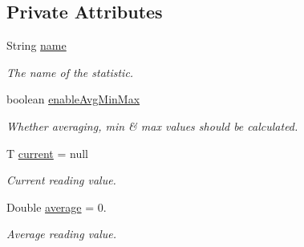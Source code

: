 \subsection*{Private Attributes}
\begin{DoxyCompactItemize}
\item 
\mbox{\label{classcom_1_1jack_1_1motorbikestatistics_1_1_data_item_a09f8b80430dc1620acbe3532d900fc5a}} 
String \hyperlink{classcom_1_1jack_1_1motorbikestatistics_1_1_data_item_a09f8b80430dc1620acbe3532d900fc5a}{name}
\begin{DoxyCompactList}\small\item\em The name of the statistic. \end{DoxyCompactList}\item 
\mbox{\label{classcom_1_1jack_1_1motorbikestatistics_1_1_data_item_a7cfeefe9064017755f8462421693d2a9}} 
boolean \hyperlink{classcom_1_1jack_1_1motorbikestatistics_1_1_data_item_a7cfeefe9064017755f8462421693d2a9}{enable\+Avg\+Min\+Max}
\begin{DoxyCompactList}\small\item\em Whether averaging, min \& max values should be calculated. \end{DoxyCompactList}\item 
\mbox{\label{classcom_1_1jack_1_1motorbikestatistics_1_1_data_item_a48cf1c273c44e2181a99d56c48868d1d}} 
T \hyperlink{classcom_1_1jack_1_1motorbikestatistics_1_1_data_item_a48cf1c273c44e2181a99d56c48868d1d}{current} = null
\begin{DoxyCompactList}\small\item\em Current reading value. \end{DoxyCompactList}\item 
\mbox{\label{classcom_1_1jack_1_1motorbikestatistics_1_1_data_item_a720fe4f7fa02578cc8e0a59ef784746d}} 
Double \hyperlink{classcom_1_1jack_1_1motorbikestatistics_1_1_data_item_a720fe4f7fa02578cc8e0a59ef784746d}{average} = 0.
\begin{DoxyCompactList}\small\item\em Average reading value. \end{DoxyCompactList}\item 

\end{DoxyCompactItemize}
